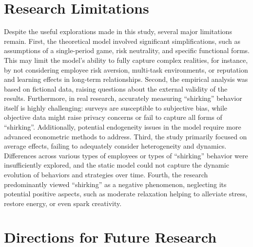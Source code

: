 \section{Research Limitations}

Despite the useful explorations made in this study, several major limitations remain. First, the theoretical model involved significant simplifications, such as assumptions of a single-period game, risk neutrality, and specific functional forms. This may limit the model's ability to fully capture complex realities, for instance, by not considering employee risk aversion, multi-task environments, or reputation and learning effects in long-term relationships. Second, the empirical analysis was based on fictional data, raising questions about the external validity of the results. Furthermore, in real research, accurately measuring \enquote{shirking} behavior itself is highly challenging: surveys are susceptible to subjective bias, while objective data might raise privacy concerns or fail to capture all forms of \enquote{shirking}. Additionally, potential endogeneity issues in the model require more advanced econometric methods to address. Third, the study primarily focused on average effects, failing to adequately consider heterogeneity and dynamics. Differences across various types of employees or types of \enquote{shirking} behavior were insufficiently explored, and the static model could not capture the dynamic evolution of behaviors and strategies over time. Fourth, the research predominantly viewed \enquote{shirking} as a negative phenomenon, neglecting its potential positive aspects, such as moderate relaxation helping to alleviate stress, restore energy, or even spark creativity.

\section{Directions for Future Research}

